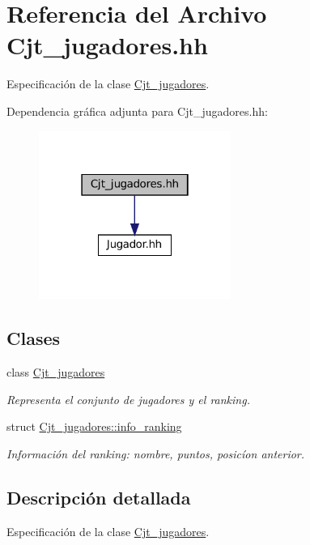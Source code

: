 \hypertarget{_cjt__jugadores_8hh}{}\section{Referencia del Archivo Cjt\+\_\+jugadores.\+hh}
\label{_cjt__jugadores_8hh}


Especificación de la clase \hyperlink{class_cjt__jugadores}{Cjt\+\_\+jugadores}.  


Dependencia gráfica adjunta para Cjt\+\_\+jugadores.\+hh\+:\nopagebreak
\begin{figure}[H]
\begin{center}
\leavevmode
\includegraphics[width=178pt]{_cjt__jugadores_8hh__incl}
\end{center}
\end{figure}
\subsection*{Clases}
\begin{DoxyCompactItemize}
\item 
class \hyperlink{class_cjt__jugadores}{Cjt\+\_\+jugadores}
\begin{DoxyCompactList}\small\item\em Representa el conjunto de jugadores y el ranking. \end{DoxyCompactList}\item 
struct \hyperlink{struct_cjt__jugadores_1_1info__ranking}{Cjt\+\_\+jugadores\+::info\+\_\+ranking}
\begin{DoxyCompactList}\small\item\em Información del ranking\+: nombre, puntos, posicíon anterior. \end{DoxyCompactList}\end{DoxyCompactItemize}


\subsection{Descripción detallada}
Especificación de la clase \hyperlink{class_cjt__jugadores}{Cjt\+\_\+jugadores}. 


